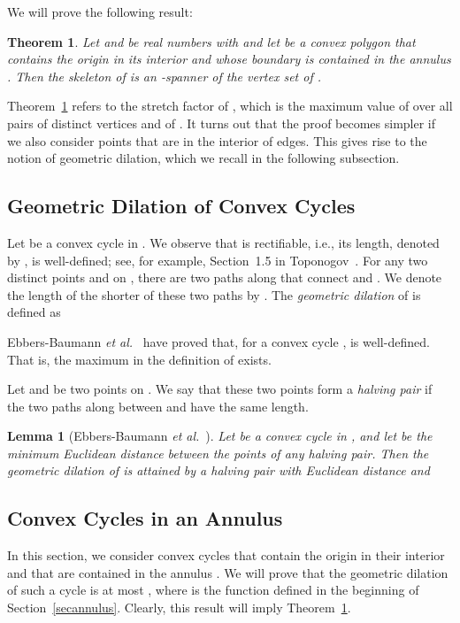 \documentclass[12pt]{article}
\newtheorem{theorem}{Theorem}
\newtheorem{lemma}{Lemma}
\begin{document}
We will prove the following result:  
 
\begin{theorem}    \label{thmpolygon}  
Let  and  be real numbers with  and let  be a convex 
polygon that contains the origin in its interior and whose boundary is 
contained in the annulus . Then the skeleton of  is an 
-spanner of the vertex set of . 
\end{theorem} 

Theorem~\ref{thmpolygon} refers to the stretch factor of , 
which is the maximum value of  over all
pairs of distinct vertices  and  of . It turns out that the 
proof becomes simpler if we also consider points that are in the interior 
of edges. This gives rise to the notion of geometric dilation, which 
we recall in the following subsection.    


\subsection{Geometric Dilation of Convex Cycles} 
Let  be a convex cycle in . We observe that  is 
rectifiable, i.e., its length, denoted by , is well-defined; 
see, for example, Section~1.5 in Toponogov~\cite{t-dgcs-06}. For any two 
distinct points  and  on , there are two paths along  that 
connect  and . We denote the length of the shorter of these two 
paths by . The \emph{geometric dilation} of  is defined as 
  
Ebbers-Baumann \emph{et al.}~\cite{egk-gdcpc-07} have proved that, for 
a convex cycle ,  is well-defined. That is, the maximum 
in the definition of  exists.   

Let  and  be two points on . We say that these two points form a 
\emph{halving pair} if the two paths along  between  and  have 
the same length. 

\begin{lemma}[Ebbers-Baumann \emph{et al.}~\cite{egk-gdcpc-07}] 
\label{lemEB}  
Let  be a convex cycle in , and let  be the minimum 
Euclidean distance between the points of any halving pair. Then the 
geometric dilation of  is attained by a halving pair with Euclidean 
distance  and   
 
\end{lemma} 

\subsection{Convex Cycles in an Annulus}  \label{secCC} 
In this section, we consider convex cycles  that contain the origin 
in their interior and that are contained in the annulus . 
We will prove that the geometric dilation of such a cycle is at most 
, where  is the function defined in the beginning of 
Section~\ref{secannulus}. Clearly, this result will imply  
Theorem~\ref{thmpolygon}.  
\end{document}
